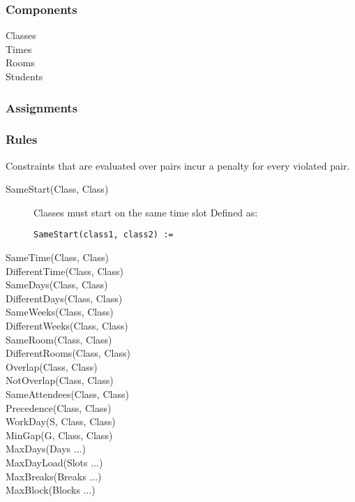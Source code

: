 \subsubsection{Components}
\begin{description}
\item[Classes]
\item[Times]
\item[Rooms]
\item[Students]
\end{description}

\subsubsection{Assignments}


\subsubsection{Rules}

Constraints that are evaluated over pairs incur a penalty for every violated pair.

\begin{description}
\item[SameStart(Class, Class)]
Classes must start on the same time slot
Defined as:
\begin{verbatim}
SameStart(class1, class2) :=
\end{verbatim}

\item[SameTime(Class, Class)]


\item[DifferentTime(Class, Class)]
\item[SameDays(Class, Class)]
\item[DifferentDays(Class, Class)]
\item[SameWeeks(Class, Class)]
\item[DifferentWeeks(Class, Class)]
\item[SameRoom(Class, Class)]
\item[DifferentRooms(Class, Class)]
\item[Overlap(Class, Class)]
\item[NotOverlap(Class, Class)]
\item[SameAttendees(Class, Class)]
\item[Precedence(Class, Class)]
\item[WorkDay(S, Class, Class)]
\item[MinGap(G, Class, Class)]
\item[MaxDays(Days ...)]
\item[MaxDayLoad(Slots ...)]
\item[MaxBreaks(Breaks ...)]
\item[MaxBlock(Blocks ...)]
\end{description}
